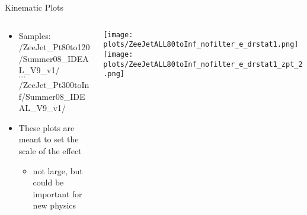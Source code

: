 \documentclass{beamer}
\begin{document}
\begin{frame}{Kinematic Plots}
  \begin{columns}
    \begin{column}{5cm} 
      \begin{itemize}
      \item Samples: \\ {\tiny{/ZeeJet\_Pt80to120/Summer08\_IDEAL\_V9\_v1/} \\ \normalsize{$\cdots$} \\ \tiny{/ZeeJet\_Pt300toInf/Summer08\_IDEAL\_V9\_v1/}}
        \bigskip
      \item These plots are meant to set the scale of the effect
        \begin{itemize}
        \item not large, but could be important for new physics
        \end{itemize}
      \end{itemize}
    \end{column}
    
    \begin{column}{6.55cm}
      \texttt{[image: plots/ZeeJetALL80toInf\_nofilter\_e\_drstat1.png]}
      \vspace{-0.25cm}
      \texttt{[image: plots/ZeeJetALL80toInf\_nofilter\_e\_drstat1\_zpt\_2.png]}
    \end{column}
    
  \end{columns}
\end{frame}
\end{document}
